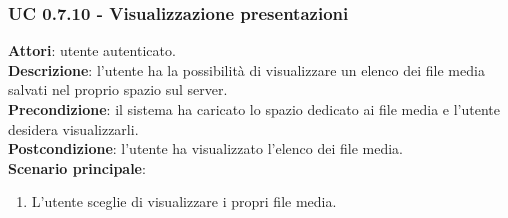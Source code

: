 	\subsubsection{UC 0.7.10 - Visualizzazione presentazioni}{
		\label{uc0.7.10}
		\textbf{Attori}: utente autenticato.	\\
		\textbf{Descrizione}: l'utente ha la possibilità di visualizzare un elenco dei file media salvati nel proprio spazio sul server. \\
		\textbf{Precondizione}: il sistema ha caricato lo spazio dedicato ai file media e l'utente desidera visualizzarli.	\\
		\textbf{Postcondizione}: l'utente ha visualizzato l'elenco dei file media.	\\
		\textbf{Scenario principale}:
		\begin{enumerate}
			\item L'utente sceglie di visualizzare i propri file media.
		\end{enumerate}
		}